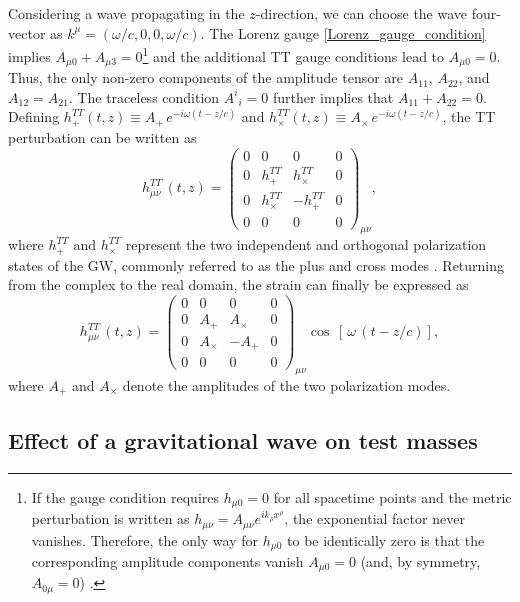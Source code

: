 Considering a wave propagating in the $z$-direction, we can choose the wave four-vector as $k^\mu = (\omega/c, 0, 0, \omega/c)$. The Lorenz gauge \eqref{Lorenz_gauge_condition} implies $A_{\mu 0} + A_{\mu 3} = 0$\footnote{If the gauge condition requires $h_{\mu 0}=0$ for all spacetime points and the metric perturbation is written as 
$h_{\mu\nu}=A_{\mu\nu}e^{i k_\rho x^\rho}$, the exponential factor never vanishes. 
Therefore, the only way for $h_{\mu 0}$ to be identically zero is that the corresponding amplitude components vanish $A_{\mu 0}=0$ (and, by symmetry, $A_{0\mu}=0$) \cite{llibretongGR}.} and the additional TT gauge conditions lead to $A_{\mu 0} = 0$.  
Thus, the only non-zero components of the amplitude tensor are $A_{11}$, $A_{22}$, and $A_{12} = A_{21}$. The traceless condition $A^{i}{}_{i} = 0$ further implies that $A_{11} + A_{22} = 0$. Defining $h^{TT}_{+}(t,z) \equiv A_{+}\,e^{-i\omega(t-z/c)}$ and $h^{TT}_{\times}(t,z) \equiv A_{\times}\,e^{-i\omega(t-z/c)}$, the TT perturbation can be written as
\begin{equation}
h^{TT}_{\mu\nu}\, (t,z) =
\begin{pmatrix}
0 & 0 & 0 & 0 \\
0 & h^{TT}_{+} & h^{TT}_{\times} & 0 \\
0 & h^{TT}_{\times} & -h^{TT}_{+} & 0 \\
0 & 0 & 0 & 0
\end{pmatrix}_{\mu\nu} ,
\end{equation}
where $h^{TT}_{+}$ and $h^{TT}_{\times}$ represent the two independent and orthogonal polarization states of the GW, commonly referred to as the plus and cross modes \cite{llibretongGR}. Returning from the complex to the real domain, the strain can finally be expressed as
\begin{equation}
h^{TT}_{\mu\nu}\, (t,z) =
\begin{pmatrix}
0 & 0 & 0 & 0 \\
0 & A_{+} & A_{\times} & 0 \\
0 & A_{\times} & -A_{+} & 0 \\
0 & 0 & 0 & 0
\end{pmatrix}_{\mu\nu}
\cos \, [\, \omega \, (t - z / c)], 
\label{polarizationmodes}
\end{equation}
where $A_{+}$ and $A_{\times}$ denote the amplitudes of the two polarization modes.



\subsection{Effect of a gravitational wave on test masses}
\label{geodesic_eq_sec}

